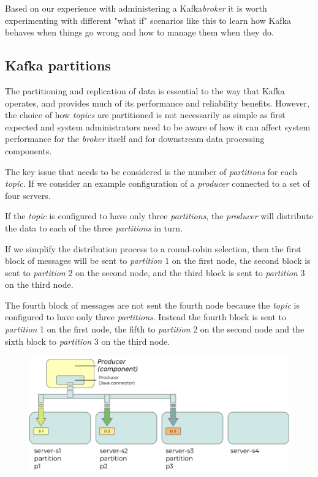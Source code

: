 \documentclass{article}
\newcommand{\kafka} {Kafka\xspace}
\newcommand{\kftopic} {\textit{topic}\xspace}
\newcommand{\kftopics} {\textit{topics}\xspace}
\newcommand{\kfbroker} {\textit{broker}\xspace}
\newcommand{\kfproducer} {\textit{producer}\xspace}
\newcommand{\kfpartition} {\textit{partition}\xspace}
\newcommand{\kfpartitions} {\textit{partitions}\xspace}
\newcommand{\javaname}[1] {{\ttfamily\color{codeblue} #1}}
\begin{document}
Based on our experience with administering a \kafka \kfbroker it is worth experimenting with different "what if" scenarios like this to learn how \kafka behaves when things go wrong and how to manage them when they do.

\subsection{Kafka partitions}
\label{kafka-partitions}

The partitioning and replication of data is essential to the way that Kafka operates, and provides much of its performance and reliability benefits.
However, the choice of how \kftopics are partitioned is not necessarily as simple as first expected and system administrators need to be aware of how it can affect system performance for the \kfbroker itself and for downstream data processing components.

The key issue that needs to be considered is the number of \kfpartitions for each \kftopic. If we consider an example configuration of a \kfproducer connected to a set of four servers.

If the \kftopic is configured to have only three \kfpartitions, the \kfproducer will distribute the data to each of the three \kfpartitions in turn.

If we simplify the distribution process to a round-robin selection, then the first block of messages will be sent to \kfpartition 1 on the first node, the second block is sent to \kfpartition 2 on the second node, and the third block is sent to \kfpartition 3 on the third node.

The fourth block of messages are not sent the fourth node because the \kftopic is configured to have only three \kfpartitions.
Instead the fourth block is sent to \kfpartition 1 on the first node, the fifth to \kfpartition 2 on the second node and the sixth block to \kfpartition 3 on the third node.

\begin{figure}[hbt!]
\centering
\includegraphics{images/kafka-partitions-05.png}
%
\label{fig:kafka-partitions-05}
\end{figure}
\end{document}
